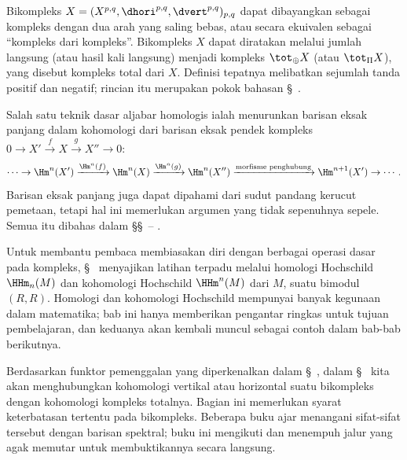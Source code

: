 Bikompleks
$X=(X^{p,q},\dhori^{p,q},\dvert^{p,q})_{p,q}$ dapat dibayangkan sebagai
kompleks dengan dua arah yang saling bebas, atau secara ekuivalen sebagai
``kompleks dari kompleks''. Bikompleks $X$ dapat diratakan melalui jumlah
langsung (atau hasil kali langsung) menjadi kompleks $\tot_{\oplus}X$ (atau
$\tot_{\Pi}X$), yang disebut kompleks total dari $X$. Definisi tepatnya
melibatkan sejumlah tanda positif dan negatif; rincian itu merupakan pokok
bahasan \S~.

Salah satu teknik dasar aljabar homologis ialah menurunkan barisan eksak
panjang dalam kohomologi dari barisan eksak pendek kompleks
$0\to X'\xrightarrow{f}X\xrightarrow{g}X''\to0$:
\[
  \cdots \to \Hm^n(X') \xrightarrow{\Hm^n(f)} \Hm^n(X)
  \xrightarrow{\Hm^n(g)} \Hm^n(X'')
  \xrightarrow{\text{morfisme penghubung}} \Hm^{n+1}(X') \to \cdots .
\]
Barisan eksak panjang juga dapat dipahami dari sudut pandang kerucut
pemetaan, tetapi hal ini memerlukan argumen yang tidak sepenuhnya sepele.
Semua itu dibahas dalam
\S\S~--%
.

Untuk membantu pembaca membiasakan diri dengan berbagai operasi dasar pada
kompleks, \S~ menyajikan latihan terpadu melalui
homologi Hochschild $\HHm_n(M)$ dan kohomologi Hochschild $\HHm^n(M)$ dari
$M$, suatu bimodul $(R,R)$. Homologi dan kohomologi Hochschild mempunyai
banyak kegunaan dalam matematika; bab ini hanya memberikan pengantar ringkas
untuk tujuan pembelajaran, dan keduanya akan kembali muncul sebagai contoh
dalam bab-bab berikutnya.

Berdasarkan funktor pemenggalan yang diperkenalkan dalam
\S~, dalam
\S~ kita akan menghubungkan
kohomologi vertikal atau horizontal suatu bikompleks dengan kohomologi
kompleks totalnya. Bagian ini memerlukan syarat keterbatasan tertentu pada
bikompleks. Beberapa buku ajar menangani sifat-sifat tersebut dengan barisan
spektral; buku ini mengikuti \cite{KS06} dan menempuh jalur yang agak memutar
untuk membuktikannya secara langsung.

